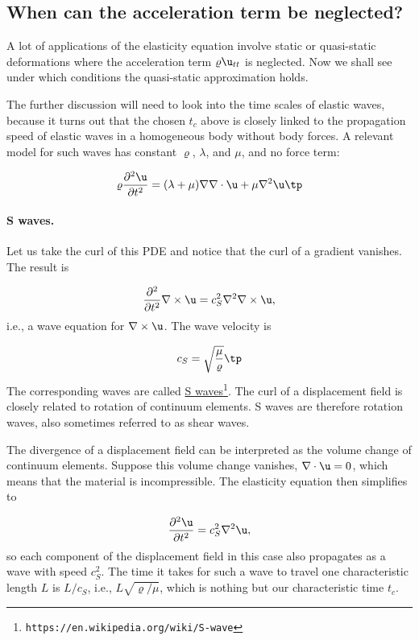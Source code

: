 \documentclass[graybox,envcountchap,sectrefs,final]{svmonodo}
\begin{document}
\subsection{When can the acceleration term be neglected?}
\label{scale:elasticity:waves}

A lot of applications of the elasticity equation involve static or
quasi-static deformations where the acceleration term
$\varrho\u_{tt}$ is neglected. Now we shall see under which conditions
the quasi-static approximation holds.

The further discussion will need to look into the time scales of
elastic waves, because it turns out that the chosen $t_c$ above is
closely linked to the propagation speed of elastic waves in a
homogeneous body without body forces.  A relevant model for
such waves has constant
$\varrho$, $\lambda$, and $\mu$, and no force term:

\begin{equation}
\varrho\frac{\partial^2\u}{\partial t^2} =
(\lambda + \mu)\nabla \nabla\cdot\u + \mu\nabla^2\u\tp
\label{scale:elasticity:waves:eq}
\end{equation}

\paragraph{S waves.}
Let us take the curl of this PDE and notice
that the curl of a  gradient vanishes. The result is

\[\frac{\partial^2}{\partial t^2}\nabla\times\u = c_S^2\nabla^2\nabla\times\u,\]
i.e., a wave equation for $\nabla\times\u$. The wave velocity is

\[ c_S = \sqrt{\frac{\mu}{\varrho}}\tp\]
The corresponding waves are called
\href{{https://en.wikipedia.org/wiki/S-wave}}{S waves}\footnote{\texttt{https://en.wikipedia.org/wiki/S-wave}}. The curl of a
displacement field is closely related to rotation of continuum elements.
S waves are therefore rotation waves, also sometimes referred to as
shear waves.

The divergence of a displacement field can be interpreted as the
volume change of continuum elements. Suppose this volume change vanishes,
$\nabla\cdot\u = 0$, which means that the material is incompressible.
The elasticity equation then simplifies to

\[\frac{\partial^2 \u}{\partial t^2} = c_S^2\nabla^2\u,\]
\label{scale:elasticity:waves:Sweq}
so each component of
the displacement field in this case also propagates as a wave
with speed $c_S^2$.
The time it takes for such a wave to travel one characteristic length
$L$ is $L/c_S$, i.e., $L\sqrt{\varrho/\mu}$, which is nothing but
our characteristic time $t_c$.
\end{document}
